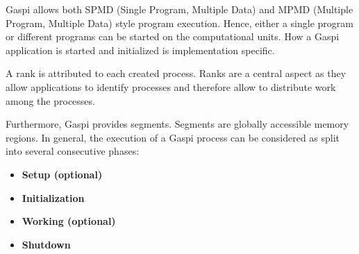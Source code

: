 \documentclass[a4paper]{article}
\newlength{\st}\setlength{\st}{0pt}
\newcommand{\GASPI}{{\sc Gaspi}}
\begin{document}
\GASPI{} allows both SPMD (Single Program, Multiple Data) and MPMD
(Multiple Program, Multiple Data) style program execution.  Hence,
either a single program or different programs can be started on the
computational units. How a \GASPI{} application is started and
initialized is implementation specific.

A rank is attributed to each created process. Ranks are a
central aspect as they allow applications to identify processes and
therefore allow to distribute work among the processes.

Furthermore, \GASPI{} provides segments. Segments are 
globally accessible memory regions. In general,
the execution of a \GASPI{} process can be considered as split
into several consecutive phases:

\begin{itemize}
\item \textbf{Setup (optional)}
\item \textbf{Initialization}
\item \textbf{Working (optional)}
\item \textbf{Shutdown}
\end{itemize}
\end{document}

